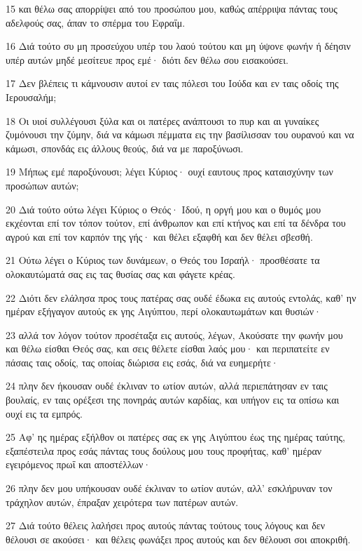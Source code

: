 \par 15 και θέλω σας απορρίψει από του προσώπου μου, καθώς απέρριψα πάντας τους αδελφούς σας, άπαν το σπέρμα του Εφραΐμ.
\par 16 Διά τούτο συ μη προσεύχου υπέρ του λαού τούτου και μη ύψονε φωνήν ή δέησιν υπέρ αυτών μηδέ μεσίτευε προς εμέ· διότι δεν θέλω σου εισακούσει.
\par 17 Δεν βλέπεις τι κάμνουσιν αυτοί εν ταις πόλεσι του Ιούδα και εν ταις οδοίς της Ιερουσαλήμ;
\par 18 Οι υιοί συλλέγουσι ξύλα και οι πατέρες ανάπτουσι το πυρ και αι γυναίκες ζυμόνουσι την ζύμην, διά να κάμωσι πέμματα εις την βασίλισσαν του ουρανού και να κάμωσι, σπονδάς εις άλλους θεούς, διά να με παροξύνωσι.
\par 19 Μήπως εμέ παροξύνουσι; λέγει Κύριος· ουχί εαυτους προς καταισχύνην των προσώπων αυτών;
\par 20 Διά τούτο ούτω λέγει Κύριος ο Θεός· Ιδού, η οργή μου και ο θυμός μου εκχέονται επί τον τόπον τούτον, επί άνθρωπον και επί κτήνος και επί τα δένδρα του αγρού και επί τον καρπόν της γής· και θέλει εξαφθή και δεν θέλει σβεσθή.
\par 21 Ούτω λέγει ο Κύριος των δυνάμεων, ο Θεός του Ισραήλ· προσθέσατε τα ολοκαυτώματά σας εις τας θυσίας σας και φάγετε κρέας.
\par 22 Διότι δεν ελάλησα προς τους πατέρας σας ουδέ έδωκα εις αυτούς εντολάς, καθ' ην ημέραν εξήγαγον αυτούς εκ γης Αιγύπτου, περί ολοκαυτωμάτων και θυσιών·
\par 23 αλλά τον λόγον τούτον προσέταξα εις αυτούς, λέγων, Ακούσατε την φωνήν μου και θέλω είσθαι Θεός σας, και σεις θέλετε είσθαι λαός μου· και περιπατείτε εν πάσαις ταις οδοίς, τας οποίας διώρισα εις εσάς, διά να ευημερήτε·
\par 24 πλην δεν ήκουσαν ουδέ έκλιναν το ωτίον αυτών, αλλά περιεπάτησαν εν ταις βουλαίς, εν ταις ορέξεσι της πονηράς αυτών καρδίας, και υπήγον εις τα οπίσω και ουχί εις τα εμπρός.
\par 25 Αφ' ης ημέρας εξήλθον οι πατέρες σας εκ γης Αιγύπτου έως της ημέρας ταύτης, εξαπέστειλα προς εσάς πάντας τους δούλους μου τους προφήτας, καθ' ημέραν εγειρόμενος πρωΐ και αποστέλλων·
\par 26 πλην δεν μου υπήκουσαν ουδέ έκλιναν το ωτίον αυτών, αλλ' εσκλήρυναν τον τράχηλον αυτών, έπραξαν χειρότερα των πατέρων αυτών.
\par 27 Διά τούτο θέλεις λαλήσει προς αυτούς πάντας τούτους τους λόγους και δεν θέλουσι σε ακούσει· και θέλεις φωνάξει προς αυτούς και δεν θέλουσι σοι αποκριθή.

